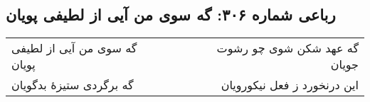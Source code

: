 \begin{center}
\section*{رباعی شماره ۳۰۶: گه سوی من آیی از لطیفی پویان}
\label{sec:sh306}
\begin{longtable}{l p{0.5cm} r}
گه سوی من آیی از لطیفی پویان
&&
گه عهد شکن شوی چو رشوت جویان
\\
گه برگردی ستیزهٔ بدگویان
&&
این درنخورد ز فعل نیکورویان
\\
\end{longtable}
\end{center}
